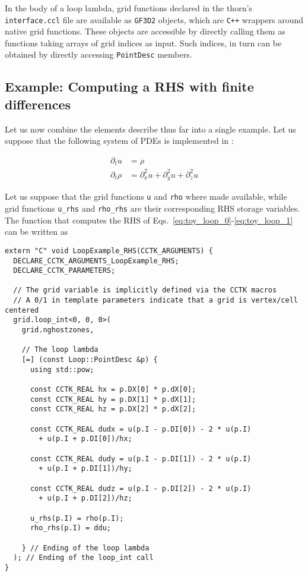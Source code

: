 In the body of a loop lambda, grid functions declared in the thorn's \texttt{interface.ccl} file are available as \texttt{GF3D2} objects, which are \texttt{C++} wrappers around native \Cactus\space grid functions. These objects are accessible by directly calling them as functions taking arrays of grid indices as input. Such indices, in turn can be obtained by directly accessing \texttt{PointDesc} members.

\subsection{Example: Computing a RHS with finite differences}

Let us now combine the elements describe thus far into a single example. Let us suppose that the following system of PDEs is implemented in \Cactus:

\begin{align}
  \partial_t u & = \rho \label{eq:toy_loop_0}\\
  \partial_t \rho & = \partial_x^2 u + \partial_y^2 u + \partial_z^2 u \label{eq:toy_loop_1}
\end{align}

Let us suppose that the grid functions \texttt{u} and \texttt{rho} where made available, while grid functions \texttt{u\_rhs} and \texttt{rho\_rhs} are their corresponding RHS storage variables. The function that computes the RHS of Eqs.~\eqref{eq:toy_loop_0}-\eqref{eq:toy_loop_1} can be written as

\begin{lstlisting}
extern "C" void LoopExample_RHS(CCTK_ARGUMENTS) {
  DECLARE_CCTK_ARGUMENTS_LoopExample_RHS;
  DECLARE_CCTK_PARAMETERS;

  // The grid variable is implicitly defined via the CCTK macros
  // A 0/1 in template parameters indicate that a grid is vertex/cell centered
  grid.loop_int<0, 0, 0>(
    grid.nghostzones,

    // The loop lambda
    [=] (const Loop::PointDesc &p) {
      using std::pow;

      const CCTK_REAL hx = p.DX[0] * p.dX[0];
      const CCTK_REAL hy = p.DX[1] * p.dX[1];
      const CCTK_REAL hz = p.DX[2] * p.dX[2];
      
      const CCTK_REAL dudx = u(p.I - p.DI[0]) - 2 * u(p.I) 
        + u(p.I + p.DI[0])/hx;

      const CCTK_REAL dudy = u(p.I - p.DI[1]) - 2 * u(p.I) 
        + u(p.I + p.DI[1])/hy;

      const CCTK_REAL dudz = u(p.I - p.DI[2]) - 2 * u(p.I) 
        + u(p.I + p.DI[2])/hz;

      u_rhs(p.I) = rho(p.I);
      rho_rhs(p.I) = ddu;

    } // Ending of the loop lambda
  ); // Ending of the loop_int call
}
\end{lstlisting}

